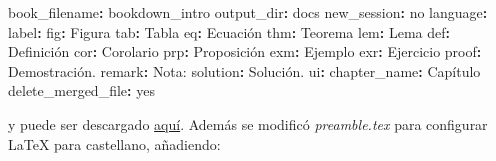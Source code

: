 \documentclass[
]{book}
\newenvironment{Shaded}{\begin{snugshade}}{\end{snugshade}}
\newcommand{\AttributeTok}[1]{\textcolor[rgb]{0.77,0.63,0.00}{#1}}
\newcommand{\CharTok}[1]{\textcolor[rgb]{0.31,0.60,0.02}{#1}}
\newcommand{\FunctionTok}[1]{\textcolor[rgb]{0.00,0.00,0.00}{#1}}
\newcommand{\KeywordTok}[1]{\textcolor[rgb]{0.13,0.29,0.53}{\textbf{#1}}}
\newcommand{\StringTok}[1]{\textcolor[rgb]{0.31,0.60,0.02}{#1}}
\theoremstyle{definition}
\theoremstyle{definition}
\theoremstyle{definition}
\theoremstyle{definition}
\theoremstyle{remark}
\begin{document}
\begin{Shaded}
\begin{Highlighting}[]
\FunctionTok{book\_filename}\KeywordTok{:}\AttributeTok{ }\StringTok{\textquotesingle{}bookdown\_intro\textquotesingle{}}
\FunctionTok{output\_dir}\KeywordTok{:}\AttributeTok{ docs}
\FunctionTok{new\_session}\KeywordTok{:}\AttributeTok{ }\CharTok{no}
\FunctionTok{language}\KeywordTok{:}
\AttributeTok{  }\FunctionTok{label}\KeywordTok{:}
\AttributeTok{    }\FunctionTok{fig}\KeywordTok{:}\AttributeTok{ }\StringTok{\textquotesingle{}Figura \textquotesingle{}}
\AttributeTok{    }\FunctionTok{tab}\KeywordTok{:}\AttributeTok{ }\StringTok{\textquotesingle{}Tabla \textquotesingle{}}
\AttributeTok{    }\FunctionTok{eq}\KeywordTok{:}\AttributeTok{ }\StringTok{\textquotesingle{}Ecuación \textquotesingle{}}
\AttributeTok{    }\FunctionTok{thm}\KeywordTok{:}\AttributeTok{ }\StringTok{\textquotesingle{}Teorema \textquotesingle{}}
\AttributeTok{    }\FunctionTok{lem}\KeywordTok{:}\AttributeTok{ }\StringTok{\textquotesingle{}Lema \textquotesingle{}}
\AttributeTok{    }\FunctionTok{def}\KeywordTok{:}\AttributeTok{ }\StringTok{\textquotesingle{}Definición \textquotesingle{}}
\AttributeTok{    }\FunctionTok{cor}\KeywordTok{:}\AttributeTok{ }\StringTok{\textquotesingle{}Corolario \textquotesingle{}}
\AttributeTok{    }\FunctionTok{prp}\KeywordTok{:}\AttributeTok{ }\StringTok{\textquotesingle{}Proposición \textquotesingle{}}
\AttributeTok{    }\FunctionTok{exm}\KeywordTok{:}\AttributeTok{ }\StringTok{\textquotesingle{}Ejemplo \textquotesingle{}}
\AttributeTok{    }\FunctionTok{exr}\KeywordTok{:}\AttributeTok{ }\StringTok{\textquotesingle{}Ejercicio \textquotesingle{}}
\AttributeTok{    }\FunctionTok{proof}\KeywordTok{:}\AttributeTok{ }\StringTok{\textquotesingle{}Demostración. \textquotesingle{}}
\AttributeTok{    }\FunctionTok{remark}\KeywordTok{:}\AttributeTok{ }\StringTok{\textquotesingle{}Nota: \textquotesingle{}}
\AttributeTok{    }\FunctionTok{solution}\KeywordTok{:}\AttributeTok{ }\StringTok{\textquotesingle{}Solución. \textquotesingle{}}
\AttributeTok{  }\FunctionTok{ui}\KeywordTok{:}
\AttributeTok{    }\FunctionTok{chapter\_name}\KeywordTok{:}\AttributeTok{ }\StringTok{\textquotesingle{}Capítulo \textquotesingle{}}
\FunctionTok{delete\_merged\_file}\KeywordTok{:}\AttributeTok{ }\CharTok{yes}
\end{Highlighting}
\end{Shaded}

y puede ser descargado \href{https://github.com/rubenfcasal/bookdown_intro/raw/master/_bookdown.yml}{aquí}.
Además se modificó \emph{preamble.tex} para configurar LaTeX para castellano, añadiendo:
\end{document}
